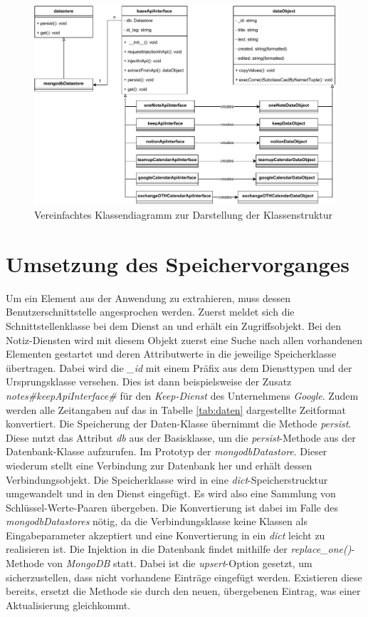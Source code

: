 \begin{figure}[H]
	\centering
	\includegraphics[width=1\textwidth]{Bilder/umsetzung/classDiagramm.pdf}
	\caption{Vereinfachtes Klassendiagramm zur Darstellung der Klassenstruktur}
	\label{fig:Klassendiagram}
\end{figure}

\section{Umsetzung des Speichervorganges}

Um ein Element aus der Anwendung zu extrahieren, muss dessen Benutzerschnittstelle angesprochen werden. Zuerst meldet sich die Schnittstellenklasse bei dem Dienst an und erhält ein Zugriffsobjekt. Bei den Notiz-Diensten wird mit diesem Objekt zuerst eine Suche nach allen vorhandenen Elementen gestartet und deren Attributwerte in die jeweilige Speicherklasse übertragen. Dabei wird die \textit{\_id} mit einem Präfix aus dem Diensttypen und der Ursprungsklasse versehen. Dies ist dann beispielsweise der Zusatz \textit{notes\#keepApiInterface\#} für den \textit{Keep-Dienst} des Unternehmens \textit{Google}. Zudem werden alle Zeitangaben auf das in Tabelle \ref{tab:daten} dargestellte Zeitformat konvertiert. Die Speicherung der Daten-Klasse übernimmt die Methode \textit{persist}. Diese nutzt das Attribut \textit{db} aus der Basisklasse, um die \textit{persist}-Methode aus der Datenbank-Klasse aufzurufen. Im Prototyp der \textit{mongodbDatastore}. Dieser wiederum stellt eine Verbindung zur Datenbank her und erhält dessen Verbindungsobjekt. Die Speicherklasse wird in eine \textit{dict}-Speicherstrucktur umgewandelt und in den Dienst eingefügt. Es wird also eine Sammlung von Schlüssel-Werte-Paaren übergeben. Die Konvertierung ist dabei im Falle des \textit{mongodbDatastores} nötig, da die Verbindungsklasse keine Klassen als Eingabeparameter akzeptiert und eine Konvertierung in ein \textit{dict} leicht zu realisieren ist. Die Injektion in die Datenbank findet mithilfe der \textit{replace\_one()}-Methode von \textit{MongoDB} statt. Dabei ist die \textit{upsert}-Option gesetzt, um sicherzustellen, dass nicht vorhandene Einträge eingefügt werden. Existieren diese bereits, ersetzt die Methode sie durch den neuen, übergebenen Eintrag, was einer Aktualisierung gleichkommt.

